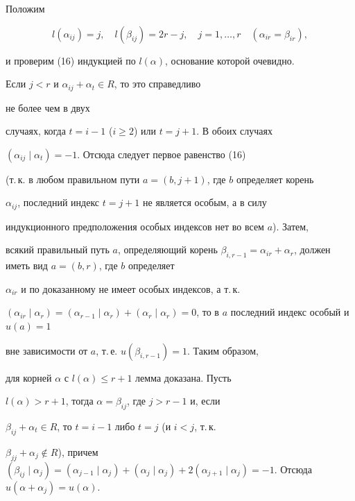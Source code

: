 \begin{pf}


Положим


$$


l(\alpha_{ij})=j,\quad l(\beta_{ij})=2r-j,\quad j=1,\dotsc,r\quad


(\alpha_{ir}=\beta_{ir}),


$$


и проверим (16) индукцией по $l(\alpha)$, основание которой очевидно.


Если $j<r$ и $\alpha_{ij}+\alpha_t\in R$, то это справедливо


не более чем в двух


случаях, когда $t=i-1$ ($i\ge 2$) или $t=j+1$. В обоих случаях


$(\alpha_{ij}\mid \alpha_t)=-1$. Отсюда следует первое равенство (16)


(т.\,к. в любом правильном пути $a=(b,j+1)$, где $b$ определяет корень


$\alpha_{ij}$, последний индекс $t=j+1$ не является особым, а в силу


индукционного предположения особых индексов нет во всем $a$). Затем,


всякий правильный путь $a$, определяющий корень $\beta_{i,r-1}=


\alpha_{ir}+\alpha_r$, должен иметь вид $a=(b,r)$, где $b$ определяет


$\alpha_{ir}$ и по доказанному не имеет особых индексов, а т.\,к.


$(\alpha_{ir}\mid \alpha_r)=(\alpha_{r-1}\mid \alpha_r)+


(\alpha_r\mid \alpha_r)=0$, то в $a$ последний индекс особый и $u(a)=1$


вне зависимости от $a$, т.\,е. $u(\beta_{i,r-1})=1$. Таким образом,


для корней $\alpha $ с $l(\alpha )\le r+1$ лемма доказана. Пусть


$l(\alpha )>r+1$, тогда $\alpha =\beta_{ij}$, где $j>r-1$ и, если


$\beta_{ij}+\alpha_t\in R$, то $t=i-1$ либо $t=j$ (и $i<j$, т.\,к.


$\beta_{jj}+\alpha_j\notin R$), причем $(\beta_{ij}\mid \alpha_j)=


(\alpha_{j-1}\mid \alpha_j)+(\alpha_j\mid \alpha_j)+


2(\alpha_{j+1}\mid \alpha_j)=-1$. Отсюда $u(\alpha +\alpha_j)=


u(\alpha )$.


\end{pf}





